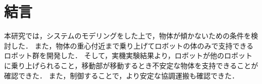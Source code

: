\section{結言}
本研究では，システムのモデリングをした上で，物体が傾かないための条件を検討した．
また，物体の重心付近まで乗り上げてロボットの体のみで支持できるロボット群を開発した．
そして，実機実験結果より，ロボットが他のロボットに乗り上げられること，移動部が移動するとき不安定な物体を支持できることが確認できた．
また，制御することで，より安定な協調運搬も確認できた．

